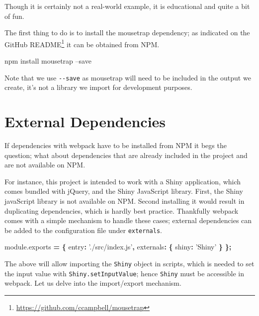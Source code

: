 \documentclass[10pt,]{krantz}
\makeatletter
\newenvironment{Shaded}{\begin{snugshade}}{\end{snugshade}}
\newcommand{\AttributeTok}[1]{\textcolor[rgb]{0.61,0.61,0.61}{#1}}
\newcommand{\DataTypeTok}[1]{\textcolor[rgb]{0.27,0.27,0.27}{#1}}
\newcommand{\ExtensionTok}[1]{#1}
\newcommand{\NormalTok}[1]{#1}
\newcommand{\OperatorTok}[1]{\textcolor[rgb]{0.43,0.43,0.43}{\textbf{#1}}}
\newcommand{\StringTok}[1]{\textcolor[rgb]{0.5,0.5,0.5}{#1}}
\newcommand{\VariableTok}[1]{\textcolor[rgb]{0,0,0}{#1}}
\renewcommand{\href}[2]{#2\footnote{\url{#1}}}
\newenvironment{kframe}{%
\medskip{}
\setlength{\fboxsep}{.8em}
 \def\at@end@of@kframe{}%
 \ifinner\ifhmode%
  \def\at@end@of@kframe{\end{minipage}}%
  \begin{minipage}{\columnwidth}%
 \fi\fi%
 \def\FrameCommand##1{\hskip\@totalleftmargin \hskip-\fboxsep
 \colorbox{shadecolor}{##1}\hskip-\fboxsep
     \hskip-\linewidth \hskip-\@totalleftmargin \hskip\columnwidth}%
 \MakeFramed {\advance\hsize-\width
   \@totalleftmargin\z@ \linewidth\hsize
   \@setminipage}}%
 {\par\unskip\endMakeFramed%
 \at@end@of@kframe}
\renewenvironment{Shaded}{\begin{kframe}}{\end{kframe}}
\makeatother
\begin{document}
Though it is certainly not a real-world example, it is educational and quite a bit of fun.

The first thing to do is to install the mousetrap dependency; as indicated on the \href{https://github.com/ccampbell/mousetrap}{GitHub README} it can be obtained from NPM.

\begin{Shaded}
\begin{Highlighting}[]
\ExtensionTok{npm}\NormalTok{ install mousetrap --save}
\end{Highlighting}
\end{Shaded}

Note that we use \texttt{-\/-save} as mousetrap will need to be included in the output we create, it's not a library we import for development purposes.

\hypertarget{webpack-intro-external-dependencies}{%
\section{External Dependencies}\label{webpack-intro-external-dependencies}}

If dependencies with webpack have to be installed from NPM it begs the question; what about dependencies that are already included in the project and are not available on NPM.

For instance, this project is intended to work with a Shiny application, which comes bundled with jQuery, and the Shiny JavaScript library. First, the Shiny javaScript library is not available on NPM. Second installing it would result in duplicating dependencies, which is hardly best practice. Thankfully webpack comes with a simple mechanism to handle these cases; external dependencies can be added to the configuration file under \texttt{externals}.

\begin{Shaded}
\begin{Highlighting}[]
\VariableTok{module}\NormalTok{.}\AttributeTok{exports} \OperatorTok{=} \OperatorTok{\{}
  \DataTypeTok{entry}\OperatorTok{:} \StringTok{'./src/index.js'}\OperatorTok{,}
  \DataTypeTok{externals}\OperatorTok{:} \OperatorTok{\{}
    \DataTypeTok{shiny}\OperatorTok{:} \StringTok{'Shiny'}
  \OperatorTok{\}}
\OperatorTok{\};}
\end{Highlighting}
\end{Shaded}

The above will allow importing the \texttt{Shiny} object in scripts, which is needed to set the input value with \texttt{Shiny.setInputValue}; hence \texttt{Shiny} must be accessible in webpack. Let us delve into the import/export mechanism.
\end{document}
